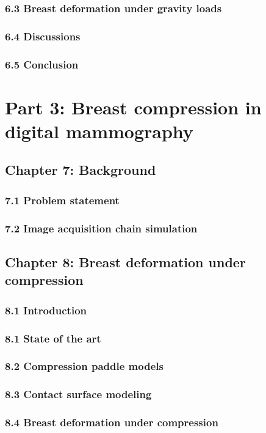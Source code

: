 \subsubsection*{6.3 Breast deformation under gravity loads }
\subsubsection*{6.4 Discussions}
\subsubsection*{6.5 Conclusion  }



\section*{Part 3: Breast compression in digital mammography}
\subsection*{Chapter 7: Background}
\subsubsection*{7.1 Problem statement}
\subsubsection*{7.2 Image acquisition chain simulation} 

\subsection*{Chapter 8: Breast deformation under compression  }
\subsubsection*{8.1 Introduction }
\subsubsection*{8.1 State of the art }
\subsubsection*{8.2 Compression paddle models} 
\subsubsection*{8.3 Contact surface modeling }
\subsubsection*{8.4 Breast deformation under compression }
